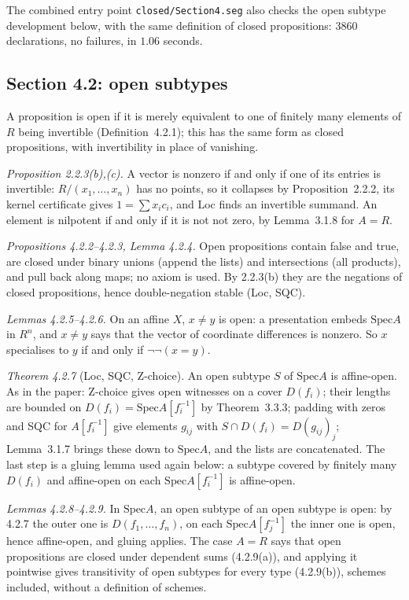 \documentclass[11pt]{article}
\newcommand{\kw}[1]{\texttt{#1}}
\newcommand{\Spec}{\mathrm{Spec}}
\theoremstyle{remark}
\begin{document}
The combined entry point \kw{closed/Section4.seg} also checks the open
subtype development below, with the same definition of closed propositions:
3860 declarations, no failures, in $1.06$ seconds.

\subsection*{Section 4.2: open subtypes}

A proposition is open if it is merely equivalent to one of finitely many
elements of $R$ being invertible (Definition~4.2.1); this has the same
form as closed propositions, with invertibility in place of vanishing.

\emph{Proposition 2.2.3(b),(c).} A vector is nonzero if and only if one of
its entries is invertible: $R/(x_1,\ldots,x_n)$ has no points, so it
collapses by Proposition~2.2.2, its kernel certificate gives
$1=\sum x_ic_i$, and Loc finds an invertible summand. An element is
nilpotent if and only if it is not not zero, by Lemma~3.1.8 for $A=R$.

\emph{Propositions 4.2.2--4.2.3, Lemma 4.2.4.} Open propositions contain
false and true, are closed under binary unions (append the lists) and
intersections (all products), and pull back along maps; no axiom is used.
By 2.2.3(b) they are the negations of closed propositions, hence
double-negation stable (Loc, SQC).

\emph{Lemmas 4.2.5--4.2.6.} On an affine $X$, $x\ne y$ is open: a
presentation embeds $\Spec A$ in $R^n$, and $x\ne y$ says that the vector
of coordinate differences is nonzero. So $x$ specialises to $y$ if and
only if $\neg\neg(x=y)$.

\emph{Theorem 4.2.7} (Loc, SQC, Z-choice). An open subtype $S$ of
$\Spec A$ is affine-open. As in the paper: Z-choice gives open witnesses
on a cover $D(f_i)$; their lengths are bounded on
$D(f_i)=\Spec A[f_i^{-1}]$ by Theorem~3.3.3; padding with zeros and SQC
for $A[f_i^{-1}]$ give elements $g_{ij}$ with $S\cap D(f_i)=D(g_{ij})_j$;
Lemma~3.1.7 brings these down to $\Spec A$, and the lists are
concatenated. The last step is a gluing lemma used again below: a
subtype covered by finitely many $D(f_i)$ and affine-open on each
$\Spec A[f_i^{-1}]$ is affine-open.

\emph{Lemmas 4.2.8--4.2.9.} In $\Spec A$, an open subtype of an open
subtype is open: by 4.2.7 the outer one is $D(f_1,\ldots,f_n)$, on each
$\Spec A[f_j^{-1}]$ the inner one is open, hence affine-open, and gluing
applies. The case $A=R$ says that open propositions are closed under
dependent sums (4.2.9(a)), and applying it pointwise gives transitivity
of open subtypes for every type (4.2.9(b)), schemes included, without a
definition of schemes.
\end{document}
